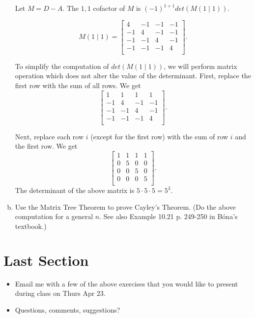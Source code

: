 \documentclass[10pt]{amsart}
\begin{document}
\begin{enumerate}[a.)]
Let $M=D-A$. 
The $1,1$ cofactor of $M$ is  $(-1)^{1+1} det(M(1\mid 1))$. 

\begin{equation*}
M(1 \mid 1) = 
\begin{bmatrix}
4 & -1 & -1 & -1 \\
-1 & 4 & -1 & -1 \\
-1 & -1 & 4 & -1 \\
-1 & -1 & -1 & 4 \\
\end{bmatrix}.
\end{equation*}

To simplify the computation of $det(M(1\mid 1))$, we will perform matrix operation which does not alter the value of the determinant. 
First, replace the first row with the sum of all rows. We get
\begin{equation*}
\begin{bmatrix}
1 & 1 & 1 & 1 \\
-1 & 4 & -1 & -1 \\
-1 & -1 & 4 & -1 \\
-1 & -1 & -1 & 4 \\
\end{bmatrix}.
\end{equation*}

Next, replace each row $i$ (except for the first row) with the sum of row $i$ and the first row. We get 
\begin{equation*}
\begin{bmatrix}
1 & 1 & 1 & 1 \\
0 & 5 & 0 & 0 \\
0 & 0 & 5 & 0 \\
0 & 0 & 0 & 5 \\
\end{bmatrix}.
\end{equation*}	
The determinant of the above matrix is $5 \cdot 5 \cdot 5 = 5^{3}$.

\bigskip

\item 
Use the Matrix Tree Theorem to prove Cayley's Theorem. 
(Do the above computation for a general $n$. See also Example 10.21 p. 249-250 in B\'ona's textbook.)

\end{enumerate}



	\section{Last Section}
\begin{itemize}
	\item 
	Email me with a few of the above exercises that you would like to present during class on Thurs Apr 23.
	\item
	Questions, comments, suggestions?
\end{itemize}
\end{document}
